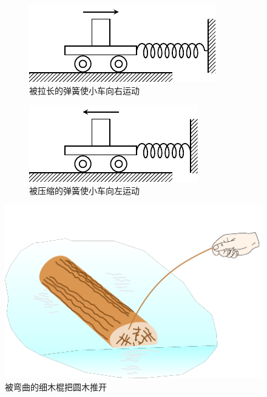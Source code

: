 \begin{figure} [htp]
	\centering
	\begin{subfigure} {0.48\linewidth} 
		\centering
		\includegraphics{fig/A/1-5a.pdf} 
		\caption{被拉长的弹簧使小车向右运动} \label{fig_A_1-5a} 
	\end{subfigure} 
	\hfill 
\begin{subfigure} {0.48\linewidth} 
	\centering
	\includegraphics{fig/A/1-5b.pdf} 
	\caption{被压缩的弹簧使小车向左运动} \label{fig_A_1-5b} 
\end{subfigure} 
\caption{} \label{fig_A_1-5} 
\end{figure} 

\begin{figure} [htp]
\centering
\includegraphics{fig/A/1-6.pdf} 
\caption{被弯曲的细木棍把圆木推开} \label{fig_A_1-6} 
\end{figure} 

